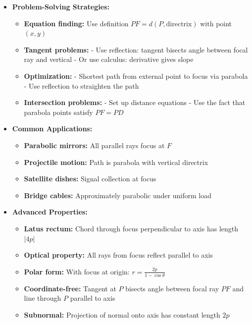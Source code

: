 \documentclass[12pt]{article}
\begin{document}
\begin{itemize}
    \item \textbf{Problem-Solving Strategies:}
    \begin{itemize}
        \item \textbf{Equation finding:} Use definition $PF = d(P, \text{directrix})$ with point $(x,y)$
        \item \textbf{Tangent problems:} 
            - Use reflection: tangent bisects angle between focal ray and vertical
            - Or use calculus: derivative gives slope
        \item \textbf{Optimization:}
            - Shortest path from external point to focus via parabola
            - Use reflection to straighten the path
        \item \textbf{Intersection problems:}
            - Set up distance equations
            - Use the fact that parabola points satisfy $PF = PD$
    \end{itemize}
    
    \item \textbf{Common Applications:}
    \begin{itemize}
        \item \textbf{Parabolic mirrors:} All parallel rays focus at $F$
        \item \textbf{Projectile motion:} Path is parabola with vertical directrix
        \item \textbf{Satellite dishes:} Signal collection at focus
        \item \textbf{Bridge cables:} Approximately parabolic under uniform load
    \end{itemize}
    
    \item \textbf{Advanced Properties:}
    \begin{itemize}
        \item \textbf{Latus rectum:} Chord through focus perpendicular to axis has length $|4p|$
        \item \textbf{Optical property:} All rays from focus reflect parallel to axis
        \item \textbf{Polar form:} With focus at origin: $r = \frac{2p}{1 - \cos\theta}$
        \item \textbf{Coordinate-free:} Tangent at $P$ bisects angle between focal ray $PF$ and line through $P$ parallel to axis
        \item \textbf{Subnormal:} Projection of normal onto axis has constant length $2p$
    \end{itemize}
    

\end{itemize}
\end{document}
